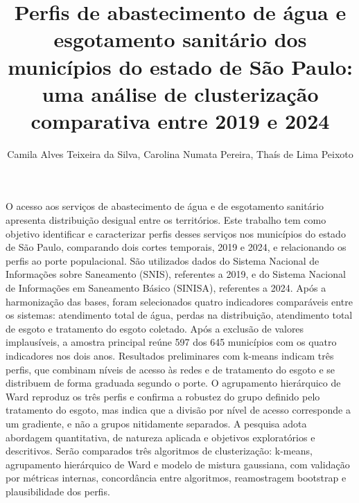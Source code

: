 \documentclass[12pt]{article}
\title{Perfis de abastecimento de água e esgotamento sanitário dos municípios
  do estado de São Paulo: uma análise de clusterização comparativa entre 2019 e 2024}
\author{Camila Alves Teixeira da Silva\inst{1}, Carolina Numata Pereira\inst{1},
  Thaís de Lima Peixoto\inst{1}}
\begin{document}
\maketitle

\begin{resumo}
  O acesso aos serviços de abastecimento de água e de esgotamento sanitário apresenta distribuição
  desigual entre os territórios. Este trabalho tem como objetivo identificar e caracterizar perfis
  desses serviços nos municípios do estado de São Paulo, comparando dois cortes temporais, 2019 e
  2024, e relacionando os perfis ao porte populacional. São utilizados dados do Sistema Nacional de
  Informações sobre Saneamento (SNIS), referentes a 2019, e do Sistema Nacional de Informações em
  Saneamento Básico (SINISA), referentes a 2024. Após a harmonização das bases, foram selecionados
  quatro indicadores comparáveis entre os sistemas: atendimento total de água, perdas na
  distribuição, atendimento total de esgoto e tratamento do esgoto coletado. Após a exclusão de
  valores implausíveis, a amostra principal reúne 597 dos 645 municípios com os quatro indicadores
  nos dois anos. Resultados preliminares com k-means indicam três perfis, que combinam
  níveis de acesso às redes e de tratamento do esgoto e se distribuem de forma graduada segundo o
  porte. O agrupamento hierárquico de Ward reproduz os três perfis e confirma a robustez do grupo
  definido pelo tratamento do esgoto, mas indica que a divisão por nível de acesso corresponde a um
  gradiente, e não a grupos nitidamente separados. A pesquisa adota abordagem quantitativa, de natureza aplicada e
  objetivos exploratórios e descritivos. Serão comparados três algoritmos de clusterização:
  k-means, agrupamento hierárquico de Ward e modelo de mistura gaussiana, com validação por métricas
  internas, concordância entre algoritmos, reamostragem bootstrap e plausibilidade dos perfis.
\end{resumo}
\end{document}
